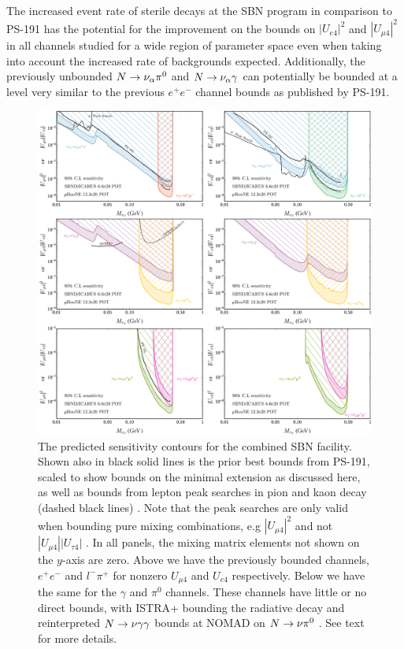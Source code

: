 \documentclass[11pt, a4paper]{article}
\def\ster{\ensuremath N}
\begin{document}
The increased event rate of sterile decays at the SBN program in comparison to PS-191 has the potential for the improvement on the bounds on $|U_{e4}|^2$ and $|U_{\mu 4}|^2$ in all channels studied for a wide region of parameter space even when taking into account the increased rate of backgrounds expected. Additionally, the previously unbounded $\ster \rightarrow \nu_\alpha \pi^0$ and $\ster \rightarrow \nu_\alpha \gamma$ can potentially be bounded at a level very similar to the previous $e^+ e^-$ channel bounds as published by PS-191.

\begin{figure}[t]
\center
\includegraphics[width=1.0\textwidth]{figures/band_sbn_new.pdf}

\caption{\label{fig:band_sbn}The predicted sensitivity contours for the combined SBN
facility. Shown also in black solid lines is the prior best bounds from PS-191,
scaled to show bounds on the minimal extension as discussed here, as well as bounds from lepton peak searches in pion and kaon decay \cite{PhysRevD.46.R885,PhysRevLett.68.3000}(dashed black lines) . Note that the peak searches are only valid when bounding pure mixing combinations, e.g $|U_{\mu 4}|^2$ and not $|U_{\mu 4}||U_{\tau 4}|$ . In all panels, the mixing matrix elements not shown on the $y$-axis are zero. Above we
have the previously bounded channels, $e^+e^-$ and $l^- \pi^+$ for nonzero $U_{\mu 4}$ and $U_{e4}$ respectively. Below we have the same for the $\gamma$ and $\pi^0$ channels. These channels have little or no direct bounds, with ISTRA+ bounding the radiative decay\cite{Duk:2011yv} and reinterpreted $\ster \rightarrow \nu \gamma \gamma$ bounds at NOMAD on $\ster \rightarrow \nu \pi^0$ \cite{Gninenko:1998nn}. See text for more details. }

\end{figure}
\end{document}
